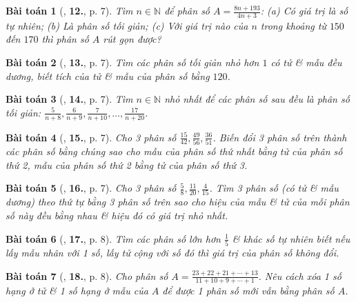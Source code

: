 \documentclass{article}
\numberwithin{equation}{section}
\newtheorem{baitoan}{Bài toán}
\begin{document}
\begin{baitoan}[\cite{Binh_Toan_6_tap_2}, \textbf{12.}, p. 7]
	Tìm $n\in\mathbb{N}$ để phân số $A = \frac{8n + 193}{4n + 3}$: (a) Có giá trị là số tự nhiên; (b) Là phân số tối giản; (c) Với giá trị nào của $n$ trong khoảng từ $150$ đến $170$ thì phân số $A$ rút gọn được?
\end{baitoan}

\begin{baitoan}[\cite{Binh_Toan_6_tap_2}, \textbf{13.}, p. 7]
	Tìm các phân số tối giản nhỏ hơn $1$ có tử \& mẫu đều dương, biết tích của tử \& mẫu của phân số bằng $120$.
\end{baitoan}

\begin{baitoan}[\cite{Binh_Toan_6_tap_2}, \textbf{14.}, p. 7]
	Tìm $n\in\mathbb{N}$ nhỏ nhất để các phân số sau đều là phân số tối giản: $\frac{5}{n + 8},\frac{6}{n + 9},\frac{7}{n + 10},\ldots,\frac{17}{n + 20}$.
\end{baitoan}

\begin{baitoan}[\cite{Binh_Toan_6_tap_2}, \textbf{15.}, p. 7]
	Cho 3 phân số $\frac{15}{42},\frac{49}{56},\frac{36}{51}$. Biến đổi 3 phân số trên thành các phân số bằng chúng sao cho mẫu của phân số thứ nhất bằng tử của phân số thứ 2, mẫu của phân số thứ 2 bằng tử của phân số thứ 3.
\end{baitoan}

\begin{baitoan}[\cite{Binh_Toan_6_tap_2}, \textbf{16.}, p. 7]
	Cho 3 phân số $\frac{5}{8},\frac{11}{20},\frac{4}{15}$. Tìm 3 phân số (có tử \& mẫu dương) theo thứ tự bằng 3 phân số trên sao cho hiệu của mẫu \& tử của mỗi phân số này đều bằng nhau \& hiệu đó có giá trị nhỏ nhất.
\end{baitoan}

\begin{baitoan}[\cite{Binh_Toan_6_tap_2}, \textbf{17.}, p. 8]
	Tìm các phân số lớn hơn $\frac{1}{5}$ \& khác số tự nhiên biết nếu lấy mẫu nhân với 1 số, lấy tử cộng với số đó thì giá trị của phân số không đổi.
\end{baitoan}

\begin{baitoan}[\cite{Binh_Toan_6_tap_2}, \textbf{18.}, p. 8]
	Cho phân số $A = \frac{23 + 22 + 21 + \cdots + 13}{11 + 10 + 9 + \cdots + 1}$. Nêu cách xóa 1 số hạng ở tử \& 1 số hạng ở mẫu của $A$ để được 1 phân số mới vẫn bằng phân số $A$.
\end{baitoan}
\end{document}
